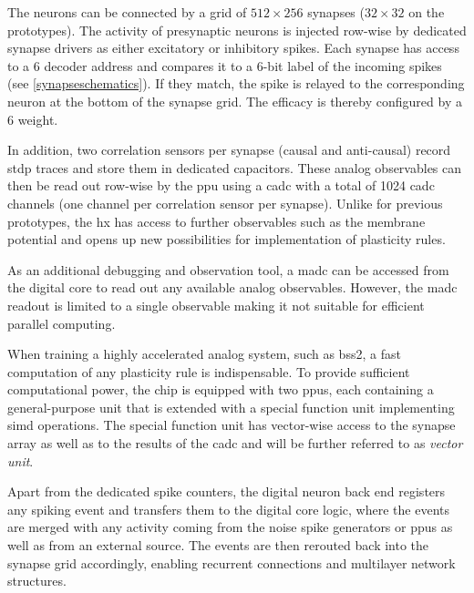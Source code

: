 The neurons can be connected by a grid of $512 \times 256$ synapses ($32 \times 32$ on the prototypes). The activity of presynaptic neurons is injected row-wise by dedicated synapse drivers as either excitatory or inhibitory spikes. Each synapse has access to a \SI{6}{\bit} decoder address and compares it to a 6-bit label of the incoming spikes (see \cref{synapseschematics}). If they match, the spike is relayed to the corresponding neuron at the bottom of the synapse grid. The efficacy is thereby configured by a \SI{6}{\bit} weight.


In addition, two correlation sensors per synapse (causal and anti-causal) record \gls{stdp} traces and store them in dedicated capacitors. These analog observables can then be read out row-wise by the \gls{ppu} using a \gls{cadc} with a total of 1024 \gls{cadc} channels (one channel per correlation sensor per synapse). Unlike for previous prototypes, the \gls{hx} has access to further observables such as the membrane potential and opens up new possibilities for implementation of plasticity rules. 

As an additional debugging and observation tool, a \gls{madc} can be accessed from the digital core to read out any available analog observables. However, the \gls{madc} readout is limited to a single observable making it not suitable for efficient parallel computing.

When training a highly accelerated analog system, such as \gls{bss2}, a fast computation of any plasticity rule is indispensable. To provide sufficient computational power, the chip is equipped with two \glspl{ppu}, each containing a general-purpose unit that is extended with a special function unit implementing \gls{simd} operations. The special function unit has vector-wise access to the synapse array as well as to the results of the \gls{cadc} and will be further referred to as \emph{vector unit}.

Apart from the dedicated spike counters, the digital neuron back end registers any spiking event and transfers them to the digital core logic, where the events are merged with any activity coming from the noise spike generators or \glspl{ppu} as well as from an external source. The events are then rerouted back into the synapse grid accordingly, enabling recurrent connections and multilayer network structures.

